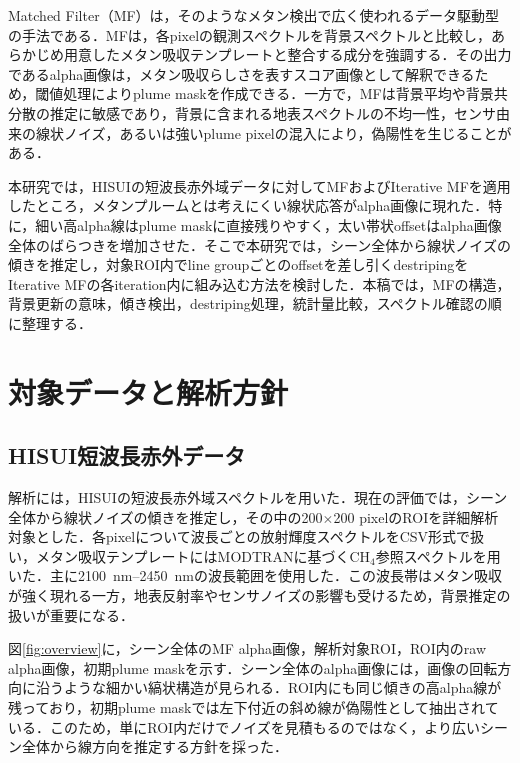\documentclass[a4paper,10pt]{ltjsarticle}
\begin{document}
Matched Filter（MF）は，そのようなメタン検出で広く使われるデータ駆動型の手法である\cite{mf}．MFは，各pixelの観測スペクトルを背景スペクトルと比較し，あらかじめ用意したメタン吸収テンプレートと整合する成分を強調する．その出力であるalpha画像は，メタン吸収らしさを表すスコア画像として解釈できるため，閾値処理によりplume maskを作成できる．一方で，MFは背景平均や背景共分散の推定に敏感であり，背景に含まれる地表スペクトルの不均一性，センサ由来の線状ノイズ，あるいは強いplume pixelの混入により，偽陽性を生じることがある．

本研究では，HISUIの短波長赤外域データに対してMFおよびIterative MFを適用したところ，メタンプルームとは考えにくい線状応答がalpha画像に現れた．特に，細い高alpha線はplume maskに直接残りやすく，太い帯状offsetはalpha画像全体のばらつきを増加させた．そこで本研究では，シーン全体から線状ノイズの傾きを推定し，対象ROI内でline groupごとのoffsetを差し引くdestripingをIterative MFの各iteration内に組み込む方法を検討した．本稿では，MFの構造，背景更新の意味，傾き検出，destriping処理，統計量比較，スペクトル確認の順に整理する．

\section{対象データと解析方針}
\subsection{HISUI短波長赤外データ}
解析には，HISUIの短波長赤外域スペクトルを用いた．現在の評価では，シーン全体から線状ノイズの傾きを推定し，その中の200$\times$200 pixelのROIを詳細解析対象とした．各pixelについて波長ごとの放射輝度スペクトルをCSV形式で扱い，メタン吸収テンプレートにはMODTRANに基づくCH$_4$参照スペクトルを用いた．主に\SIrange{2100}{2450}{nm}の波長範囲を使用した．この波長帯はメタン吸収が強く現れる一方，地表反射率やセンサノイズの影響も受けるため，背景推定の扱いが重要になる．

図\ref{fig:overview}に，シーン全体のMF alpha画像，解析対象ROI，ROI内のraw alpha画像，初期plume maskを示す．シーン全体のalpha画像には，画像の回転方向に沿うような細かい縞状構造が見られる．ROI内にも同じ傾きの高alpha線が残っており，初期plume maskでは左下付近の斜め線が偽陽性として抽出されている．このため，単にROI内だけでノイズを見積もるのではなく，より広いシーン全体から線方向を推定する方針を採った．
\end{document}
